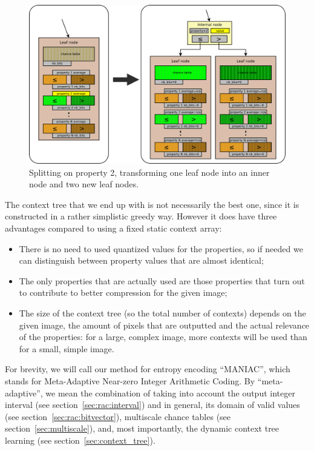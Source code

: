 \documentclass[a4paper,USenglish]{lipics}
\begin{document}
\begin{figure}
\begin{center}
\includegraphics[width=\textwidth]{images/context_split}
\end{center}
\caption{Splitting on property 2, transforming one leaf node into an inner node and two new leaf nodes.}
\label{fig:context_tree_split}
\end{figure}

The context tree that we end up with is not necessarily the best one,
since it is constructed in a rather simplistic greedy way. However it does have three advantages compared
to using a fixed static context array:
\begin{itemize}
\item
There is no need to used quantized values for the properties, so if needed we can distinguish
between property values that are almost identical;
\item
The only properties that are actually used are those properties that turn out to contribute
to better compression for the given image;
\item
The size of the context tree (so the total number of contexts) depends on the given image,
the amount of pixels that are outputted and the actual relevance of the properties:
for a large, complex image,
more contexts will be used than for a small, simple image.
\end{itemize}



For brevity, we will call our method for entropy encoding ``MANIAC'', which stands for
Meta-Adaptive Near-zero Integer Arithmetic Coding. By ``meta-adaptive'', we mean the combination of
taking into account the output integer interval (see section~\ref{sec:rac:interval})
and in general, its domain of valid values (see section~\ref{sec:rac:bitvector}),
multiscale chance tables (see section~\ref{sec:multiscale}),
and, most importantly, the dynamic context tree learning (see section~\ref{sec:context_tree}).
\end{document}
